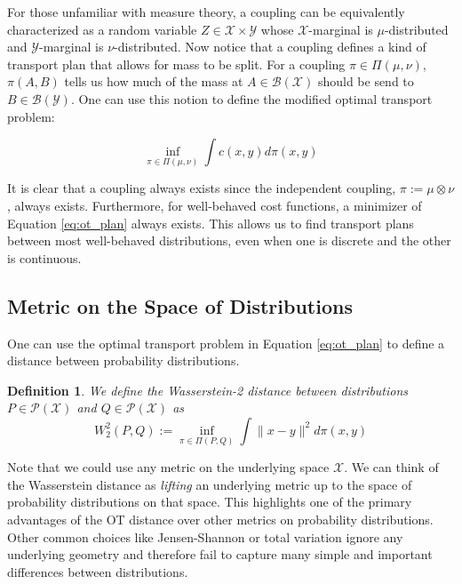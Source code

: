\documentclass[11pt, a4paper, fleqn]{article}
\let\normalint\int %
\def\int{\displaystyle\normalint} %
\numberwithin{equation}{section}
\numberwithin{figure}{section}
\numberwithin{table}{section}
\newtheorem{defn}[thm]{Definition}
\begin{document}
For those unfamiliar with measure theory, a coupling can be equivalently characterized as a random variable $Z \in \mathcal{X} \times \mathcal{Y}$ whose $\mathcal{X}$-marginal is $\mu$-distributed and $\mathcal{Y}$-marginal is $\nu$-distributed. Now notice that a coupling defines a kind of transport plan that allows for mass to be split. For a coupling $\pi \in \Pi(\mu, \nu)$, $\pi(A, B)$ tells us how much of the mass at $A\in \mathcal{B}(\mathcal{X})$ should be send to $B \in \mathcal{B}(\mathcal{Y})$. One can use this notion to define the modified optimal transport problem:

\begin{equation}\label{eq:ot_plan}
\inf\limits_{\pi \in \Pi(\mu, \nu)} \int c(x, y) d\pi(x, y) 
\end{equation}

It is clear that a coupling always exists since the independent coupling, $\pi := \mu \otimes \nu$, always exists. Furthermore, for well-behaved cost functions, a minimizer of Equation \eqref{eq:ot_plan} always exists. This allows us to find transport plans between most well-behaved distributions, even when one is discrete and the other is continuous.

\subsection{Metric on the Space of Distributions}
One can use the optimal transport problem in Equation \eqref{eq:ot_plan} to define a distance between probability distributions.

\begin{defn}
We define the Wasserstein-2 distance between distributions $P \in \mathcal{P}(\mathcal{X})$ and $Q \in \mathcal{P}(\mathcal{X})$ as
\begin{equation}
W_2^2(P, Q) := \inf\limits_{\pi \in \Pi(P, Q)} \int \|x - y \|^2 d\pi(x, y)
\end{equation}
\end{defn}

Note that we could use any metric on the underlying space $\mathcal{X}$. We can think of the Wasserstein distance as \textit{lifting} an underlying metric up to the space of probability distributions on that space. This highlights one of the primary advantages of the OT distance over other metrics on probability distributions. Other common choices like Jensen-Shannon or total variation ignore any underlying geometry and therefore fail to capture many simple and important differences between distributions.
\end{document}
